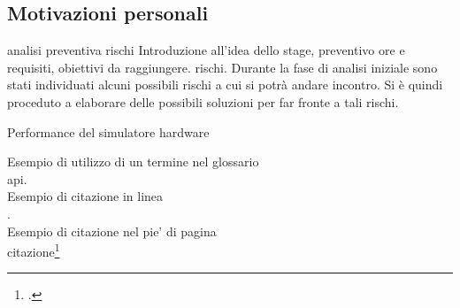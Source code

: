\subsection{Motivazioni personali}


analisi preventiva rischi
Introduzione all'idea dello stage, preventivo ore e requisiti, obiettivi da raggiungere.
rischi.
Durante la fase di analisi iniziale sono stati individuati alcuni possibili rischi a cui si potrà andare incontro.
Si è quindi proceduto a elaborare delle possibili soluzioni per far fronte a tali rischi.\\

\begin{risk}{Performance del simulatore hardware}
    \label{risk:hardware-simulator} 
\end{risk}


\noindent Esempio di utilizzo di un termine nel glossario \\
\gls{api}. \\

\noindent Esempio di citazione in linea \\
\cite{site:agile-manifesto}. \\

\noindent Esempio di citazione nel pie' di pagina \\
citazione\footcite{womak:lean-thinking} \\